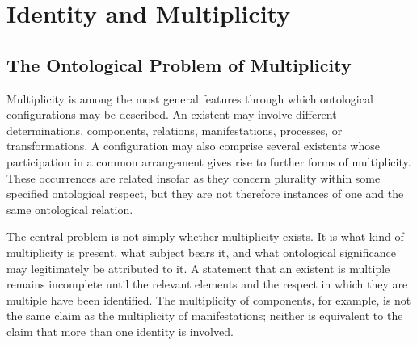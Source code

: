 %
%
%
%

\section{Identity and Multiplicity}
\label{sec:identity-and-multiplicity}

\subsection{The Ontological Problem of Multiplicity}

Multiplicity is among the most general features through which
ontological configurations may be described. An existent may involve
different determinations, components, relations, manifestations,
processes, or transformations. A configuration may also comprise
several existents whose participation in a common arrangement gives
rise to further forms of multiplicity. These occurrences are related
insofar as they concern plurality within some specified ontological
respect, but they are not therefore instances of one and the same
ontological relation.

The central problem is not simply whether multiplicity exists. It is
what kind of multiplicity is present, what subject bears it, and what
ontological significance may legitimately be attributed to it. A
statement that an existent is multiple remains incomplete until the
relevant elements and the respect in which they are multiple have
been identified. The multiplicity of components, for example, is not
the same claim as the multiplicity of manifestations; neither is
equivalent to the claim that more than one identity is involved.

